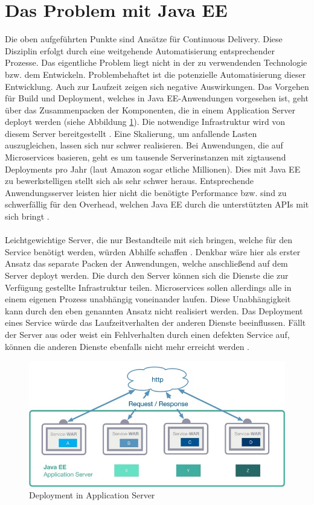 \section{Das Problem mit Java EE}
Die oben aufgeführten Punkte sind Ansätze für Continuous Delivery. Diese Disziplin erfolgt durch eine weitgehende Automatisierung entsprechender Prozesse. Das eigentliche Problem liegt nicht in der zu verwendenden Technologie bzw. dem Entwickeln. Problembehaftet ist die potenzielle Automatisierung dieser Entwicklung. Auch zur Laufzeit zeigen sich negative Auswirkungen. Das Vorgehen für Build und Deployment, welches in Java EE-Anwendungen vorgesehen ist, geht über das Zusammenpacken der Komponenten, die in einem Application Server deployt werden (siehe Abbildung \ref{fig:mp1}). Die notwendige Infrastruktur wird von diesem Server bereitgestellt \cite{LarsRowekamp.2017d}. Eine Skalierung, um anfallende Lasten auszugleichen, lassen sich nur schwer realisieren. Bei Anwendungen, die auf Microservices basieren, geht es um tausende Serverinstanzen mit zigtausend Deployments pro Jahr (laut Amazon sogar etliche Millionen). Dies mit Java EE zu bewerkstelligen stellt sich als sehr schwer heraus. Entsprechende Anwendungsserver leisten hier nicht die benötigte Performance bzw. sind zu schwerfällig für den Overhead, welchen Java EE durch die unterstützten APIs mit sich bringt \cite{jaxcenter.2016}. \\ \\
Leichtgewichtige Server, die nur Bestandteile mit sich bringen, welche für den Service benötigt werden, würden Abhilfe schaffen \cite{jaxcenter.2016}. Denkbar wäre hier als erster Ansatz das separate Packen der Anwendungen, welche anschließend auf dem Server deployt werden. Die durch den Server können sich die Dienste die zur Verfügung gestellte Infrastruktur teilen. Microservices sollen allerdings alle in einem eigenen Prozess unabhängig voneinander laufen. Diese Unabhängigkeit kann durch den eben genannten Ansatz nicht realisiert werden. Das Deployment eines Service würde das Laufzeitverhalten der anderen Dienste beeinflussen. Fällt der Server aus oder weist ein Fehlverhalten durch einen defekten Service auf, können die anderen Dienste ebenfalls nicht mehr erreicht werden \cite{LarsRowekamp.2017d}.
\begin{figure}[h!]
	\centering
	\includegraphics[width=1.0\linewidth]{images/mp1}
	\caption{Deployment in Application Server \cite{LarsRowekamp.2017d}}
	\label{fig:mp1}
\end{figure}

